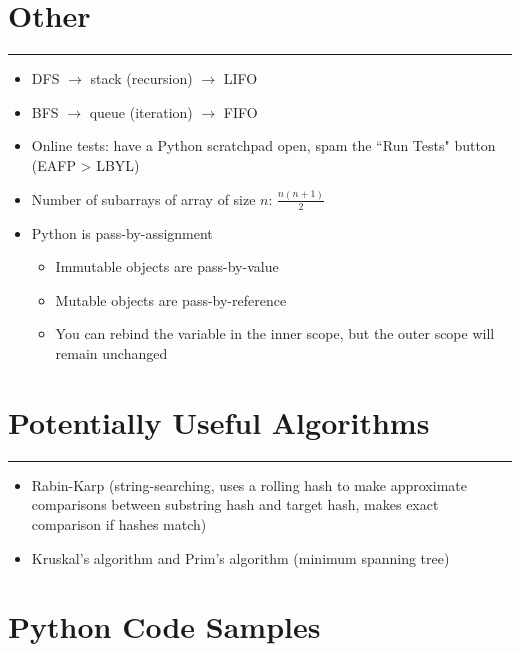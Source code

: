 \documentclass[12pt]{article}
\begin{document}
\section*{Other}
\hrule\vspace{5ex}

\begin{itemize}
  \item DFS $\rightarrow$ stack (recursion) $\rightarrow$ LIFO
  \item BFS $\rightarrow$ queue (iteration) $\rightarrow$ FIFO
  \item Online tests: have a Python scratchpad open, spam the ``Run Tests" button (EAFP > LBYL)
  \item Number of subarrays of array of size $n$: $\frac{n(n+1)}{2}$
  \item Python is pass-by-assignment
  \begin{itemize}
    \item Immutable objects are pass-by-value
    \item Mutable objects are pass-by-reference
    \item You can rebind the variable in the inner scope, but the outer scope will remain unchanged
  \end{itemize}
\end{itemize}

\section*{Potentially Useful Algorithms}
\hrule\vspace{5ex}

\begin{itemize}
  \item Rabin-Karp (string-searching, uses a rolling hash to make approximate comparisons between substring hash and target hash, makes exact comparison if hashes match)
  \item Kruskal's algorithm and Prim's algorithm (minimum spanning tree)
\end{itemize}

\appendix

\section{Python Code Samples}
\end{document}
